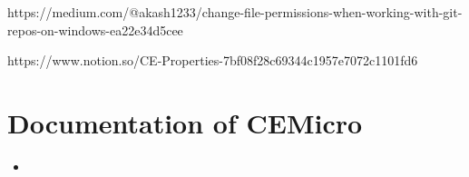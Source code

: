 https://medium.com/@akash1233/change-file-permissions-when-working-with-git-repos-on-windows-ea22e34d5cee

https://www.notion.so/CE-Properties-7bf08f28c69344c1957e7072c1101fd6


\section{Documentation of CEMicro}

\begin{itemize}
  \item {}
\end{itemize}
